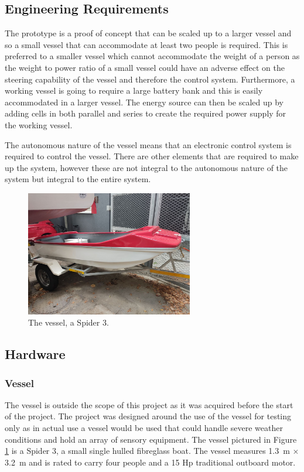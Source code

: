 	\subsection{Engineering Requirements}
	The prototype is a proof of concept that can be scaled up to a larger vessel and so a small vessel that can accommodate at least two people is required. This is preferred to a smaller vessel which cannot accommodate the weight of a person as the weight to power ratio of a small vessel could have an adverse effect on the steering capability of the vessel and therefore the control system.
	Furthermore, a working vessel is going to require a large battery bank and this is easily accommodated in a larger vessel. The energy source can then be scaled up by adding cells in both parallel and series to create the required power supply for the working vessel.\par
	The autonomous nature of the vessel means that an electronic control system is required to control the vessel. There are other elements that are required to make up the system, however these are not integral to the autonomous nature of the system but integral to the entire system. \par
\begin{figure}
	\begin{center}
		\includegraphics[width = 0.65\textwidth]{figures/spider3.jpg}
		\caption{The vessel, a Spider 3.}
		\label{fig:3:spider}
	\end{center}
\end{figure}
	\subsection{Hardware}\par
		\subsubsection{Vessel}
		The vessel is outside the scope of this project as it was acquired before the start of the project. The project was designed around the use of the vessel for testing only as in actual use a vessel would be used that could handle severe weather conditions and hold an array of sensory equipment. The vessel pictured in Figure \ref{fig:3:spider} is a Spider 3, a small single hulled fibreglass boat. The vessel measures \SI{1.3}{\meter} $\times$ \SI{3.2}{\meter} and is rated to carry four people and a 15 Hp traditional outboard motor.\par
